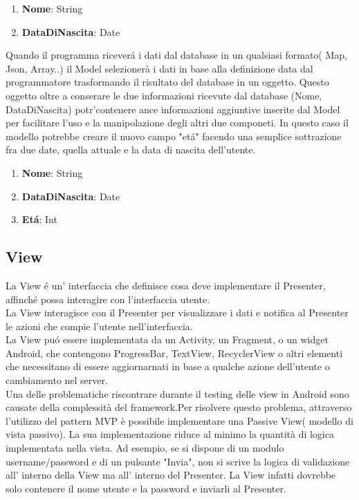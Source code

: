\begin{enumerate}
\item \textbf{Nome}: String
\item \textbf{DataDiNascita}: Date
\end{enumerate}

Quando il programma ricever\'a i dati dal database in un qualsiasi formato( Map, Json, Array..) il Model selezionerà i dati in base alla definizione data dal programmatore trasformando il risultato del database in un oggetto.
Questo oggetto oltre a conserare le due informazioni ricevute dal database (Nome, DataDiNascita) potr'\a contenere ance informazioni aggiuntive inserite dal Model per facilitare l'uso e la manipolazione degli altri due componeti.
In questo caso il modello potrebbe creare il nuovo campo "et\'a" facendo una semplice sottrazione fra due date, quella attuale e la data di nascita dell'utente.

\begin{enumerate}
\item \textbf{Nome}: String
\item \textbf{DataDiNascita}: Date
\item \textbf{Et\'a}: Int
\end{enumerate}


\subsection{View}
La View \'e un' interfaccia che definisce cosa deve implementare il Presenter, affinch\'e possa interagire con l'interfaccia utente.\\
La View interagisce con il Presenter per visualizzare i dati e notifica al Presenter le azioni che compie l'utente nell'interfaccia.\\
La View pu\'o essere implementata da un Activity, un Fragment, o un widget Android, che contengono ProgressBar, TextView, RecyclerView o altri elementi che necessitano di essere aggiornarnati in base a qualche azione dell'utente o cambiamento nel server.\\
Una delle problematiche riscontrare durante il testing delle view in Android sono causate della complessità del framework.Per risolvere questo problema, attraverso l'utilizzo del pattern MVP è possibile implementare una Passive View( modello di vista passivo).
La sua implementazione riduce al minimo la quantità di logica implementata nella vista.
Ad esempio, se si dispone di un modulo username/password e di un pulsante "Invia", non si scrive la logica di validazione all' interno della View ma all' interno del Presenter. La View infatti dovrebbe solo contenere il nome utente e la password e inviarli al Presenter.



